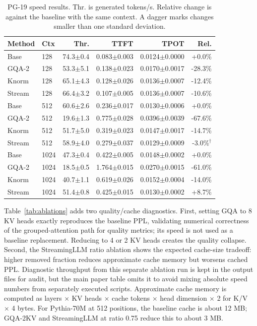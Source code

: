 \documentclass{article}
\begin{document}
\begin{table}[!htbp]
  \caption{PG-19 speed results. Thr. is generated tokens/s. Relative change is against the baseline with the same context. A dagger marks changes smaller than one standard deviation.}
  \label{tab:speed_pg}
  \centering
  \small
  \setlength{\tabcolsep}{3pt}
  \begin{tabular}{llrrrr}
    \toprule
    Method & Ctx & Thr. & TTFT & TPOT & Rel. \\
    \midrule
    Base & 128 & 74.3$\pm$0.4 & 0.083$\pm$0.003 & 0.0124$\pm$0.0000 & +0.0\% \\
    GQA-2 & 128 & 53.3$\pm$5.1 & 0.138$\pm$0.023 & 0.0170$\pm$0.0017 & -28.3\% \\
    Knorm & 128 & 65.1$\pm$4.3 & 0.128$\pm$0.026 & 0.0136$\pm$0.0007 & -12.4\% \\
    Stream & 128 & 66.4$\pm$3.2 & 0.107$\pm$0.005 & 0.0136$\pm$0.0007 & -10.6\% \\
    Base & 512 & 60.6$\pm$2.6 & 0.236$\pm$0.017 & 0.0130$\pm$0.0006 & +0.0\% \\
    GQA-2 & 512 & 19.6$\pm$1.3 & 0.775$\pm$0.028 & 0.0396$\pm$0.0039 & -67.6\% \\
    Knorm & 512 & 51.7$\pm$5.0 & 0.319$\pm$0.023 & 0.0147$\pm$0.0017 & -14.7\% \\
    Stream & 512 & 58.9$\pm$4.0 & 0.279$\pm$0.037 & 0.0129$\pm$0.0009 & -3.0\%$^\dagger$ \\
    Base & 1024 & 47.3$\pm$0.4 & 0.422$\pm$0.005 & 0.0148$\pm$0.0002 & +0.0\% \\
    GQA-2 & 1024 & 18.5$\pm$0.5 & 1.764$\pm$0.015 & 0.0270$\pm$0.0015 & -61.0\% \\
    Knorm & 1024 & 40.7$\pm$1.1 & 0.619$\pm$0.026 & 0.0152$\pm$0.0004 & -14.0\% \\
    Stream & 1024 & 51.4$\pm$0.8 & 0.425$\pm$0.015 & 0.0130$\pm$0.0002 & +8.7\% \\
    \bottomrule
  \end{tabular}
\end{table}

\FloatBarrier

Table~\ref{tab:ablations} adds two quality/cache diagnostics. First, setting GQA to 8 KV heads exactly reproduces the baseline PPL, validating numerical correctness of the grouped-attention path for quality metrics; its speed is not used as a baseline replacement. Reducing to 4 or 2 KV heads creates the quality collapse. Second, the StreamingLLM ratio ablation shows the expected cache-size tradeoff: higher removed fraction reduces approximate cache memory but worsens cached PPL. Diagnostic throughput from this separate ablation run is kept in the output files for audit, but the main paper table omits it to avoid mixing absolute speed numbers from separately executed scripts. Approximate cache memory is computed as layers $\times$ KV heads $\times$ cache tokens $\times$ head dimension $\times$ 2 for K/V $\times$ 4 bytes. For Pythia-70M at 512 positions, the baseline cache is about 12 MB; GQA-2KV and StreamingLLM at ratio 0.75 reduce this to about 3 MB.
\end{document}
